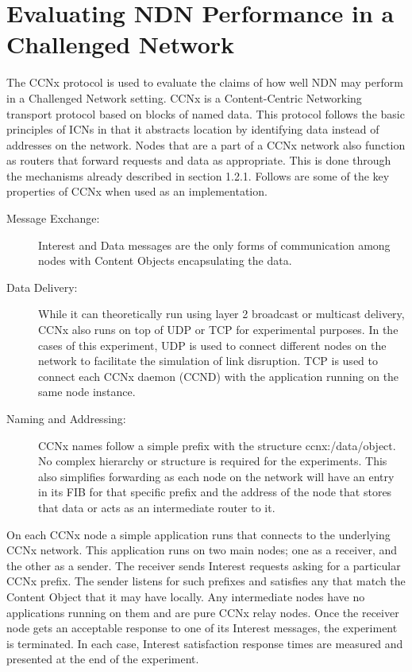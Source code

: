 \documentclass[a4paper,12pt]{report}      %
\begin{document}
\pagebreak
\chapter{Evaluating NDN Performance in a Challenged Network}

The CCNx protocol \cite{CCNxproto} is used to evaluate the claims of how well NDN may perform in a Challenged Network setting. CCNx is a Content-Centric Networking transport protocol based on blocks of named data. This protocol follows the basic principles of ICNs in that it abstracts location by identifying data instead of addresses on the network. Nodes that are a part of a CCNx network also function as routers that forward requests and
data as appropriate. This is done through the mechanisms already described in section 1.2.1. Follows
are some of the key properties of CCNx when used as an implementation.

\begin{description}
\item[Message Exchange:] Interest and Data messages are the only forms of communication among nodes
with Content Objects encapsulating the data.

\item[Data Delivery:] While it can theoretically run using layer 2 broadcast or multicast delivery, CCNx also
runs on top of UDP or TCP for experimental purposes. In the cases of this experiment, UDP is used to
connect different nodes on the network to facilitate the simulation of link disruption. TCP is used to
connect each CCNx daemon (CCND) with the application running on the same node instance.

\item[Naming and Addressing:] CCNx names follow a simple prefix with the structure ccnx:/data/object. No
complex hierarchy or structure is required for the experiments. This also simplifies forwarding as each
node on the network will have an entry in its FIB for that specific prefix and the address of the node
that stores that data or acts as an intermediate router to it.
\end{description}

On each CCNx node a simple application runs that connects to the underlying CCNx network. This
application runs on two main nodes; one as a receiver, and the other as a sender. The receiver sends
Interest requests asking for a particular CCNx prefix. The sender listens for such prefixes and satisfies
any that match the Content Object that it may have locally. Any intermediate nodes have no
applications running on them and are pure CCNx relay nodes. Once the receiver node gets an
acceptable response to one of its Interest messages, the experiment is terminated. In each case, Interest
satisfaction response times are measured and presented at the end of the experiment.
\end{document}
